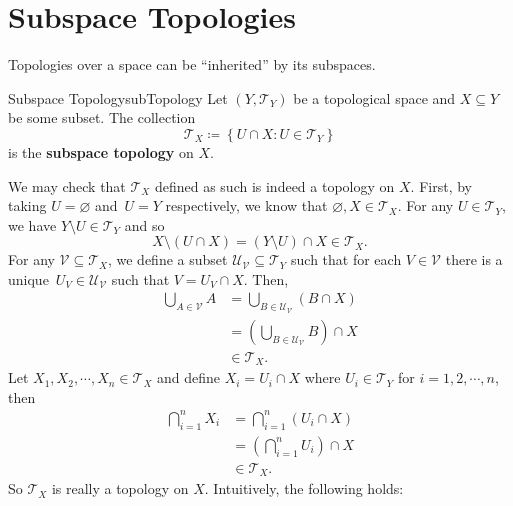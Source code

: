 \documentclass[math]{amznotes}
\theoremstyle{remark}
\begin{document}
\section{Subspace Topologies}
Topologies over a space can be ``inherited'' by its subspaces.
\begin{dfnbox}{Subspace Topology}{subTopology}
    Let $\left(Y, \mathcal{T}_Y\right)$ be a topological space and $X \subseteq Y$ be some subset. The collection
    \begin{equation*}
        \mathcal{T}_X \coloneqq \left\{U \cap X \colon U \in \mathcal{T}_Y\right\}
    \end{equation*}
    is the {\color{red} \textbf{subspace topology}} on $X$.
\end{dfnbox}
We may check that $\mathcal{T}_X$ defined as such is indeed a topology on $X$. First, by taking $U = \varnothing$ and~$U = Y$ respectively, we know that $\varnothing, X \in \mathcal{T}_X$. For any $U \in \mathcal{T}_Y$, we have $Y \setminus U \in \mathcal{T}_Y$ and so 
\begin{equation*}
    X \setminus \left(U \cap X\right) = \left(Y \setminus U\right) \cap X \in \mathcal{T}_X.
\end{equation*}
For any $\mathcal{V} \subseteq \mathcal{T}_X$, we define a subset $\mathcal{U_{\mathcal{V}}} \subseteq \mathcal{T}_Y$ such that for each $V \in \mathcal{V}$ there is a unique~$U_V \in \mathcal{U}_{\mathcal{V}}$ such that $V = U_V \cap X$. Then, 
\begin{align*}
    \bigcup_{A \in \mathcal{V}}A & = \bigcup_{B \in \mathcal{U}_{\mathcal{V}}}\left(B \cap X\right) \\
    & = \left(\bigcup_{B \in \mathcal{U}_{\mathcal{V}}}B\right) \cap X \\
    & \in \mathcal{T}_X.
\end{align*}
Let $X_1, X_2, \cdots, X_n \in \mathcal{T}_X$ and define $X_i = U_i \cap X$ where $U_i \in \mathcal{T}_Y$ for $i = 1, 2, \cdots, n$, then 
\begin{align*}
    \bigcap_{i = 1}^nX_i & = \bigcap_{i = 1}^n\left(U_i \cap X\right) \\
    & = \left(\bigcap_{i = 1}^nU_i\right) \cap X \\
    & \in \mathcal{T}_X.
\end{align*}
So $\mathcal{T}_X$ is really a topology on $X$. Intuitively, the following holds:
\end{document}
